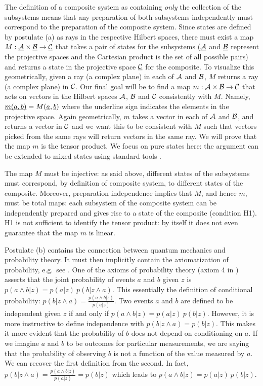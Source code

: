 \documentclass[aps,prl,amsmath,amssymb,twocolumn,nofootinbib]{revtex4}
\theoremstyle{plain}
\theoremstyle{definition}
\theoremstyle{remark}
\newcommand{\pj}[1] {\underbar{$#1$}}
\begin{document}
	The definition of a composite system as containing {\em only} the
	collection of the subsystems means that any preparation of both
	subsystems independently must correspond to the preparation of the
	composite system. Since states are defined by postulate (a) as rays in
	the respective Hilbert spaces, there must exist a map $M : \pj{\cal A}
	\times \pj{\cal B } \to \pj{\cal C}$ that takes a pair of states for
	the subsystems ($\pj{\cal A}$ and $\pj{\cal B }$ represent the
	projective spaces and the Cartesian product is the set of all possible
	pairs) and returns a state in the projective space $\pj{\cal C}$ for
	the composite. To visualize this geometrically, given a ray (a complex plane) in each of $\cal A$ and $\cal B$, $M$ returns a ray (a complex plane) in $\cal C$.  Our final goal will be to find a map
	$m:{\cal A}\times{\cal B}\to{\cal C}$ that acts on vectors in the
	Hilbert spaces $\cal A$, $\cal B$ and $\cal C$ consistently with $M$. Namely,
	$\pj{m(a,b)}=M(\pj{a},\pj{b})$ where the underline sign indicates the
	elements in the projective space. Again geometrically, $m$ takes a vector in each of $\cal A$ and $\cal B$, and returns a vector in $\cal C$ and we want this to be consistent with $M$ such that vectors picked from the same rays will return vectors in the same ray. We will prove that the map $m$ is
	the tensor product. We focus on pure states here: the argument can be
	extended to mixed states using standard tools \cite{nielsenchuang}.
	
	The map $M$ must be injective: as said above, different states of the
	subsystems must correspond, by definition of composite system, to
	different states of the composite. Moreover, preparation independence
	implies that $M$, and hence $m$, must be total maps: each subsystem of
	the composite system can be independently prepared and gives rise to a
	state of the composite (condition H1).  H1 is not sufficient
	to identify the tensor product: by itself it does not even guarantee
	that the map $m$ is linear.
	
	Postulate (b) contains the connection between quantum mechanics
	and probability theory. It must then implicitly contain the
	axiomatization of probability, e.g.~see
	\cite{ballentinepaper,ballentinebook,cox}. One of the axioms of
	probability theory (axiom 4 in \cite{ballentinepaper}) asserts that
	the joint probability of events $a$ and $b$ given $z$ is
	$p(a\wedge b|z)=p(a|z)\:p(b|z\wedge a)$. This essentially the definition of conditional probability: $p(b|z\wedge a) = \frac{p(a\wedge b|z)}{p(a|z)}$. Two events $a$ and $b$ are defined to be 
	independent given $z$ if and only if $p(a\wedge b|z)=p(a|z)\:p(b|z)$. However, it is more instructive to define independence with $p(b|z\wedge a)=p(b|z)$. This makes it more evident that the probability of $b$ does not depend on conditioning on $a$. If we imagine $a$ and $b$ to be outcomes for particular measurements, we are saying that the probability of observing $b$ is not a function of the value measured by $a$. We can recover the first definition from the second. In fact, $p(b|z\wedge a)=\frac{p(a\wedge b|z)}{p(a|z)} =p(b|z)$ which leads to $p(a\wedge b|z)=p(a|z)\:p(b|z)$.
	
\end{document}
